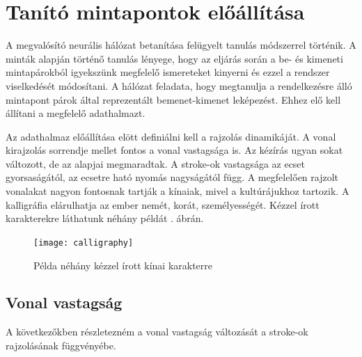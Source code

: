 \section{Tanító mintapontok előállítása}

A megvalósító neurális hálózat betanítása felügyelt tanulás módszerrel történik. A minták alapján történő tanulás lényege, hogy az eljárás során a be- és kimeneti mintapárokból igyekszünk megfelelő ismereteket kinyerni és ezzel a rendszer viselkedését módosítani. A hálózat feladata, hogy megtanulja a rendelkezésre álló mintapont párok által reprezentált bemenet-kimenet leképezést. Ehhez elő kell állítani a megfelelő adathalmazt.

Az adathalmaz előállítása elött definiálni kell a rajzolás dinamikáját. A vonal kirajzolás sorrendje mellet fontos a vonal vastagsága is. Az kézírás ugyan sokat változott, de az alapjai megmaradtak. A stroke-ok vastagsága az ecset gyorsaságától, az ecsetre ható nyomás nagyságától függ. A megfelelően rajzolt vonalakat nagyon fontosnak tartják a kínaiak, mivel a kultúrájukhoz tartozik. A kalligráfia elárulhatja az ember nemét, korát, személyességét. Kézzel írott karakterekre láthatunk néhány példát . ábrán.

\begin{figure}[h]
\centering
\texttt{[image: calligraphy]}
\caption{Példa néhány kézzel írott kínai karakterre}
\label{fig:calligraphy}
\end{figure}

\subsection{Vonal vastagság}

A következőkben részletezném a vonal vastagság változását a stroke\cite{StrokeCJ9}-ok rajzolásának függvényébe. 


